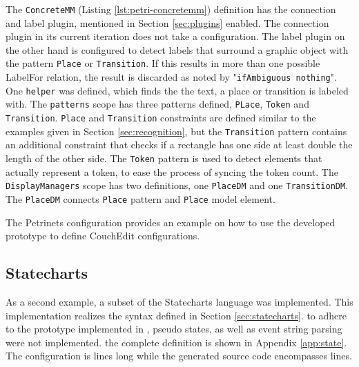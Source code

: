 The \texttt{ConcreteMM} (Listing \ref{lst:petri-concretemm}) definition has the connection and label  plugin, mentioned in Section \ref{sec:plugins} enabled. The connection plugin in its current iteration does not take a configuration. The label plugin on the other hand is configured to detect labels that surround a graphic object with the pattern \texttt{Place} or \texttt{Transition}. If this results in more than one possible LabelFor relation, the result is discarded as noted by "\texttt{ifAmbiguous nothing}". One \texttt{helper} was defined, which finds the the text, a place or transition is labeled with. The \texttt{patterns} scope has three patterns defined, \texttt{PLace}, \texttt{Token} and \texttt{Transition}. \texttt{Place} and \texttt{Transition} constraints are defined similar to the examples given in Section \ref{sec:recognition}, but the \texttt{Transition} pattern contains an additional constraint that checks if a rectangle has one side at least double the length of the other side. The \texttt{Token} pattern is used to detect elements that actually represent a token, to ease the process of syncing the token count. The \texttt{DisplayManagers} scope has two definitions, one \texttt{PlaceDM} and one \texttt{TransitionDM}. The \texttt{PlaceDM} connects \texttt{Place} pattern and \texttt{Place} model element.

The Petrinets configuration provides an example on how to use the developed prototype to define CouchEdit configurations. 



\subsection{Statecharts}
\label{sec:state-impl}
As a second example, a subset of the Statecharts language was implemented. This implementation realizes the syntax defined in Section \ref{sec:statecharts}. to adhere to the prototype implemented in \cite{nachreiner_couchedit_2020}, pseudo states, as well as event string parsing were not implemented. the complete definition is shown in Appendix \ref{app:state}. The configuration is \stateConfigLoC lines long while the generated source code encompasses \stateGeneratedLoC lines.

